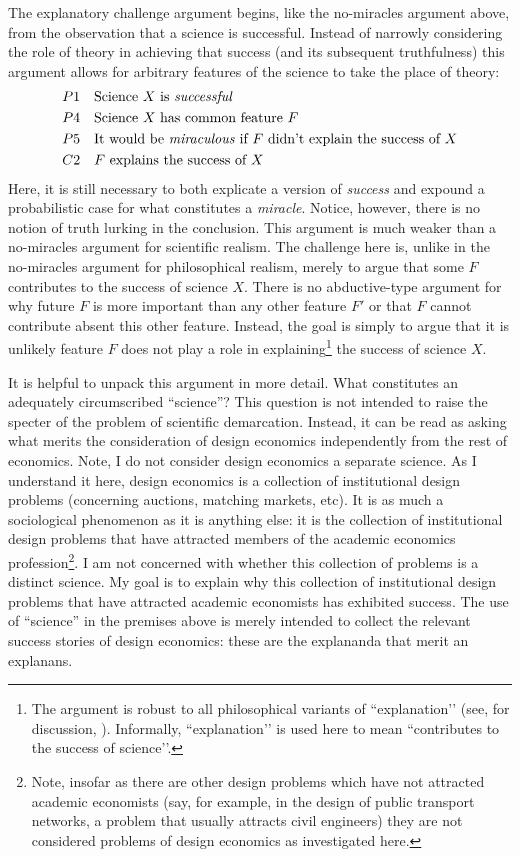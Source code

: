 The explanatory challenge argument begins, like the no-miracles argument above, from the observation that a science is successful. Instead of narrowly considering the role of theory in achieving that success (and its subsequent truthfulness) this argument allows for arbitrary features of the science to take the place of theory:
\begin{align*}
    & P1 \quad \text{Science $X$ is \textit{successful}} \\
    & P4 \quad \text{Science $X$ has common feature $F$} \\
    & P5 \quad \text{It would be \textit{miraculous} if $F$ didn't explain the success of $X$} \\
    & C2 \quad \text{$F$ explains the success of $X$}
\end{align*}
\noindent Here, it is still necessary to both explicate a version of \textit{success} and expound a probabilistic case for what constitutes a \textit{miracle}. Notice, however, there is no notion of truth lurking in the conclusion. This argument is much weaker than a no-miracles argument for scientific realism. The challenge here is, unlike in the no-miracles argument for philosophical realism, merely to argue that some $F$ contributes to the success of science $X$. There is no abductive-type argument for why future $F$ is more important than any other feature $F'$ or that $F$ cannot contribute absent this other feature. Instead, the goal is simply to argue that it is unlikely feature $F$ does not play a role in explaining\footnote{The argument is robust to all philosophical variants of ``explanation’’ (see, for discussion, \cite{woodward2021}). Informally, ``explanation’’ is used here to mean ``contributes to the success of science’’.} the success of science $X$.

It is helpful to unpack this argument in more detail. What constitutes an adequately circumscribed ``science''? This question is not intended to raise the specter of the problem of scientific demarcation. Instead, it can be read as asking what merits the consideration of design economics independently from the rest of economics. Note, I do not consider design economics a separate science. As I understand it here, design economics is a collection of institutional design problems (concerning auctions, matching markets, etc). It is as much a sociological phenomenon as it is anything else: it is the collection of institutional design problems that have attracted members of the academic economics profession\footnote{Note, insofar as there are other design problems which have not attracted academic economists (say, for example, in the design of public transport networks, a problem that usually attracts civil engineers) they are not considered problems of design economics as investigated here.}. I am not concerned with whether this collection of problems is a distinct science. My goal is to explain why this collection of institutional design problems that have attracted academic economists has exhibited success. The use of ``science'' in the premises above is merely intended to collect the relevant success stories of design economics: these are the explananda that merit an explanans. 

